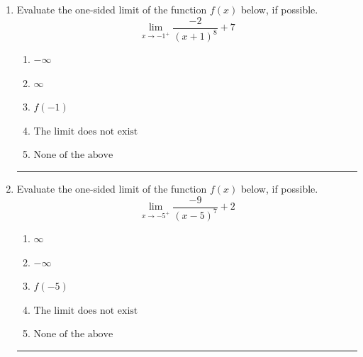 \documentclass[14pt]{extbook}
\newcommand{\litem}[1]{\item#1\hspace*{-1cm}\rule{\textwidth}{0.4pt}}
\begin{document}
\begin{enumerate}
{\begin{enumerate}[label=\Alph*.]
\end{enumerate} }
\litem{
Evaluate the one-sided limit of the function $f(x)$ below, if possible.\[ \lim_{x \rightarrow -1^+} \frac{-2}{(x+1)^8}+7 \]\begin{enumerate}[label=\Alph*.]
\item \( -\infty \)
\item \( \infty \)
\item \( f(-1) \)
\item \( \text{The limit does not exist} \)
\item \( \text{None of the above} \)

\end{enumerate} }
\litem{
Evaluate the one-sided limit of the function $f(x)$ below, if possible.\[ \lim_{x \rightarrow -5^+} \frac{-9}{(x-5)^7}+2 \]\begin{enumerate}[label=\Alph*.]
\item \( \infty \)
\item \( -\infty \)
\item \( f(-5) \)
\item \( \text{The limit does not exist} \)
\item \( \text{None of the above} \)

\end{enumerate} }
\end{enumerate}
\end{document}
